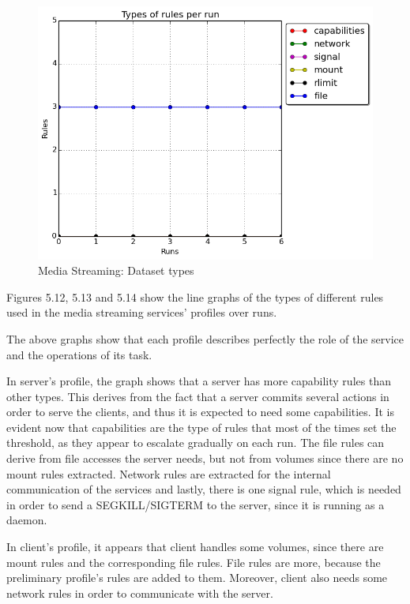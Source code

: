 \hfill\break\hfill\break\hfill\break\hfill\break\hfill\break\hfill\break\hfill\break\hfill\break\hfill\break\hfill\break\hfill\break\hfill\break\hfill\break\hfill\break\hfill\break\hfill\break\hfill\break\hfill\break

\begin{figure}[h!]
  \centering
   \includegraphics[width=0.7\linewidth]{../figures/mediastreaming/types_cloudsuitemedia-streamingdataset.png}
   \caption{Media Streaming: Dataset types}
\end{figure}

Figures 5.12, 5.13 and 5.14 show the line graphs of the types of different rules used in the media streaming services' profiles over runs. 

The above graphs show that each profile describes perfectly the role of the service and the operations of its task.

In server's profile, the graph shows that a server has more capability rules than other types. This derives from the fact that a server commits several actions in order to serve the clients, and thus it is expected to need some capabilities. It is evident now that capabilities are the type of rules that most of the times set the threshold, as they appear to escalate gradually on each run. The file rules can derive from file accesses the server needs, but not from volumes since there are no mount rules extracted. Network rules are extracted for the internal communication of the services and lastly, there is one signal rule, which is needed in order to send a SEGKILL/SIGTERM to the server, since it is running as a daemon.

In client's profile, it appears that client handles some volumes, since there are mount rules and the corresponding file rules. File rules are more, because the preliminary profile's rules are added to them. Moreover, client also needs some network rules in order to communicate with the server.

